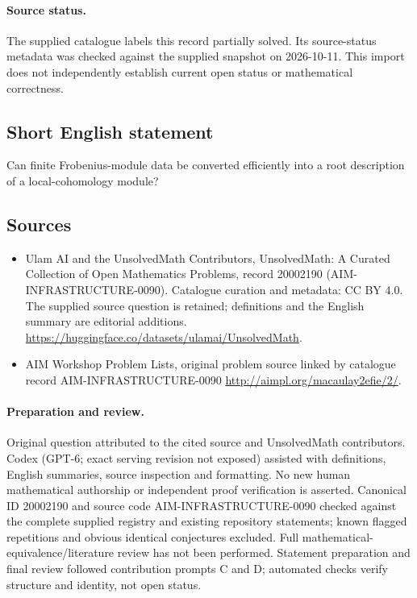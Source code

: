 \documentclass[11pt]{article}
\begin{document}
\paragraph{Source status.}
The supplied catalogue labels this record partially solved. Its source-status metadata was checked against the supplied snapshot on 2026-10-11. This import does not independently establish current open status or mathematical correctness.
\subsection{Short English statement}
Can finite Frobenius-module data be converted efficiently into a root description of a local-cohomology module?
\subsection{Sources}
\begin{itemize}
\item[\hypertarget{source:20002190:1}{S1}] Ulam AI and the UnsolvedMath Contributors, UnsolvedMath: A Curated Collection of Open Mathematics Problems, record 20002190 (AIM-INFRASTRUCTURE-0090). Catalogue curation and metadata: CC BY 4.0. The supplied source question is retained; definitions and the English summary are editorial additions.
\url{https://huggingface.co/datasets/ulamai/UnsolvedMath}.
\item[\hypertarget{source:20002190:2}{S2}] AIM Workshop Problem Lists, original problem source linked by catalogue record AIM-INFRASTRUCTURE-0090
\url{http://aimpl.org/macaulay2efie/2/}.
\end{itemize}
\paragraph{Preparation and review.}
Original question attributed to the cited source and UnsolvedMath contributors. Codex (GPT-6; exact serving revision not exposed) assisted with definitions, English summaries, source inspection and formatting. No new human mathematical authorship or independent proof verification is asserted. Canonical ID 20002190 and source code AIM-INFRASTRUCTURE-0090 checked against the complete supplied registry and existing repository statements; known flagged repetitions and obvious identical conjectures excluded. Full mathematical-equivalence/literature review has not been performed. Statement preparation and final review followed contribution prompts C and D; automated checks verify structure and identity, not open status.
\label{end:20002190}
\end{document}
